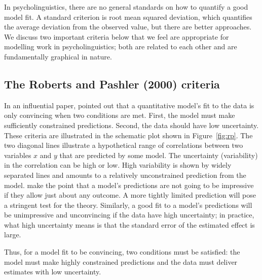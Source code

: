 \documentclass{cambridge7A}\usepackage[]{graphicx}\usepackage[]{color}
\begin{document}
In psycholinguistics, there are no general standards on how to
quantify a good model fit. A standard criterion is root mean squared
deviation, which quantifies the average deviation from the observed
value, but there are better approaches. We discuss two important
criteria below that we feel are appropriate for modelling work in
psycholinguistics; both are related to each other and are
fundamentally graphical in nature.

\subsection{The Roberts and Pashler (2000) criteria}

In an influential paper, \cite{rp} pointed out that a quantitative
model's fit to the data is only convincing when two conditions are
met. First, the model must make sufficiently constrained
predictions. Second, the data should have low uncertainty. These
criteria are illustrated in the schematic plot shown in
Figure~\ref{fig:rp}. The two diagonal lines illustrate a hypothetical
range of correlations between two variables $x$ and $y$ that are
predicted by some model. The uncertainty (variability) in the 
correlation can be high or low. High variability is shown by widely
separated lines and amounts to a relatively unconstrained prediction
from the model. \cite{rp} make the point that a model's predictions
are not going to be impressive if they allow just about any outcome. A
more tightly limited prediction will pose a stringent test for the
theory.  Similarly, a good fit to a
model's predictions will be unimpressive and unconvincing if the data have
high uncertainty; in practice, what high uncertainty means is that 
the standard error of the estimated effect is large.

Thus, for a model fit to be convincing, two conditions must be
satisfied: the model must make highly constrained predictions and the
data must deliver estimates with low uncertainty.
\end{document}
